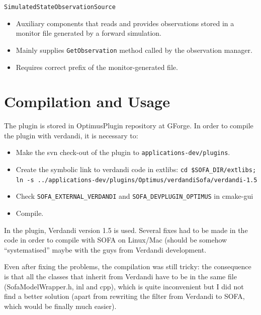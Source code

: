 \documentclass[10pt]{article}
\begin{document}
\medskip
{\large\texttt{SimulatedStateObservationSource}}
\begin{itemize}
\item Auxiliary components that reads and provides observations stored in a monitor file generated by a forward simulation.
\item Mainly supplies \texttt{GetObservation} method called by the observation manager. 
\item Requires correct prefix of the monitor-generated file. 
\end{itemize}

\section{Compilation and Usage}
The plugin is stored in OptimusPlugin repository at GForge. In order to compile the plugin with verdandi, it is necessary to:
\begin{itemize}
\item Make the svn check-out of the plugin to \texttt{applications-dev/plugins}.
\item Create the symbolic link to verdandi code in extlibs: \newline \texttt{cd \$SOFA\_DIR/extlibs; \newline ln -s
../applications-dev/plugins/Optimus/verdandiSofa/verdandi-1.5}
\item Check \texttt{SOFA\_EXTERNAL\_VERDANDI} and \texttt{SOFA\_DEVPLUGIN\_OPTIMUS} in cmake-gui
\item Compile.
\end{itemize}

In the plugin, Verdandi version 1.5 is used. Several fixes had to be made in the code in order to compile with SOFA on Linux/Mac (should be somehow
``systematised'' maybe with the guys from Verdandi development.

Even after fixing the problems, the compilation was still tricky: the consequence is that all the classes that inherit from Verdandi have to be in the
same file (SofaModelWrapper.h, inl and cpp), which is quite inconvenient but I did not find a better solution (apart from rewriting the filter from
Verdandi to SOFA, which would be finally much easier). 


\end{document}
